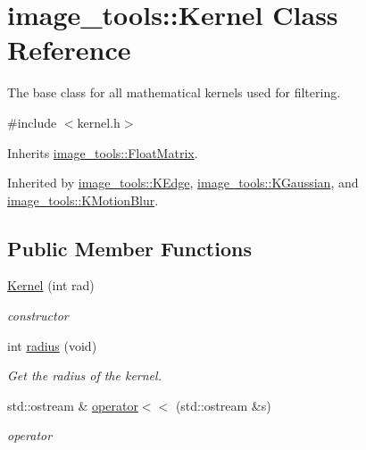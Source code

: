 \hypertarget{classimage__tools_1_1Kernel}{}\section{image\+\_\+tools\+:\+:Kernel Class Reference}
\label{classimage__tools_1_1Kernel}


The base class for all mathematical kernels used for filtering.  




{\ttfamily \#include $<$kernel.\+h$>$}



Inherits \hyperlink{classimage__tools_1_1FloatMatrix}{image\+\_\+tools\+::\+Float\+Matrix}.



Inherited by \hyperlink{classimage__tools_1_1KEdge}{image\+\_\+tools\+::\+K\+Edge}, \hyperlink{classimage__tools_1_1KGaussian}{image\+\_\+tools\+::\+K\+Gaussian}, and \hyperlink{classimage__tools_1_1KMotionBlur}{image\+\_\+tools\+::\+K\+Motion\+Blur}.

\subsection*{Public Member Functions}
\begin{DoxyCompactItemize}
\item 
\hyperlink{classimage__tools_1_1Kernel_ac25b0cb8f8e9398d7d628f3bda16b5c9}{Kernel} (int rad)\hypertarget{classimage__tools_1_1Kernel_ac25b0cb8f8e9398d7d628f3bda16b5c9}{}\label{classimage__tools_1_1Kernel_ac25b0cb8f8e9398d7d628f3bda16b5c9}

\begin{DoxyCompactList}\small\item\em constructor \end{DoxyCompactList}\item 
int \hyperlink{classimage__tools_1_1Kernel_ac834d16a242dd4a15f5f5e4a6dacea01}{radius} (void)\hypertarget{classimage__tools_1_1Kernel_ac834d16a242dd4a15f5f5e4a6dacea01}{}\label{classimage__tools_1_1Kernel_ac834d16a242dd4a15f5f5e4a6dacea01}

\begin{DoxyCompactList}\small\item\em Get the radius of the kernel. \end{DoxyCompactList}\item 
std\+::ostream \& \hyperlink{classimage__tools_1_1Kernel_a46730d0d219b8a1abbbbb849b58a55a9}{operator$<$$<$} (std\+::ostream \&s)\hypertarget{classimage__tools_1_1Kernel_a46730d0d219b8a1abbbbb849b58a55a9}{}\label{classimage__tools_1_1Kernel_a46730d0d219b8a1abbbbb849b58a55a9}

\begin{DoxyCompactList}\small\item\em operator \end{DoxyCompactList}\end{DoxyCompactItemize}
